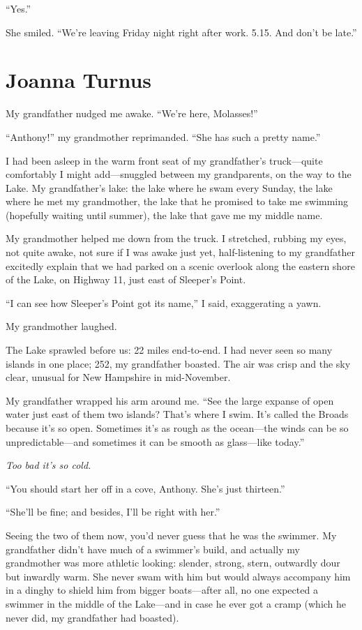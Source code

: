 ``Yes.''

She smiled. ``We're leaving Friday night right after work. 5.15. And
don't be late.''

\chapter{Joanna Turnus}

\titlemark

My grandfather nudged me awake. ``We're here, Molasses!''

``Anthony!'' my grandmother reprimanded. ``She has such a pretty name.''

I had been asleep in the warm front seat of my grandfather's
truck---quite comfortably I might add---snuggled between my
grandparents, on the way to the Lake. My grandfather's lake: the lake
where he swam every Sunday, the lake where he met my grandmother, the
lake that he promised to take me swimming (hopefully waiting until
summer), the lake that gave me my middle name.

My grandmother helped me down from the truck. I stretched, rubbing my
eyes, not quite awake, not sure if I was awake just yet, half-listening
to my grandfather excitedly explain that we had parked on a scenic
overlook along the eastern shore of the Lake, on Highway 11, just east
of Sleeper's Point.

``I can see how Sleeper's Point got its name,'' I said, exaggerating a
yawn.

My grandmother laughed.

The Lake sprawled before us: 22 miles end-to-end. I had never seen so
many islands in one place; 252, my grandfather boasted. The air was
crisp and the sky clear, unusual for New Hampshire in mid-November.

My grandfather wrapped his arm around me. ``See the large expanse of
open water just east of them two islands? That's where I swim. It's
called the Broads because it's so open. Sometimes it's as rough as the
ocean---the winds can be so unpredictable---and sometimes it can be
smooth as glass---like today.''

\emph{Too bad it's so cold.}

``You should start her off in a cove, Anthony. She's just thirteen.''

``She'll be fine; and besides, I'll be right with her.''

Seeing the two of them now, you'd never guess that he was the swimmer.
My grandfather didn't have much of a swimmer's build, and actually my
grandmother was more athletic looking: slender, strong, stern, outwardly
dour but inwardly warm. She never swam with him but would always
accompany him in a dinghy to shield him from bigger boats---after all,
no one expected a swimmer in the middle of the Lake---and in case he
ever got a cramp (which he never did, my grandfather had boasted).

